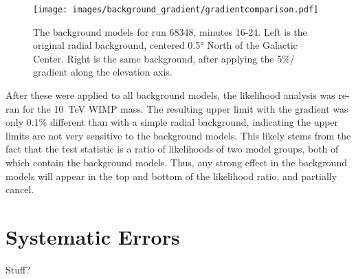  \begin{figure}[ht]
    \centering
    \texttt{[image: images/background\_gradient/gradientcomparison.pdf]}
    \caption[Background Gradient Comparison]{
      The background models for run 68348, minutes 16-24.
      Left is the original radial background, centered \ang{0.5} North of the Galactic Center.
      Right is the same background, after applying the 5\%/\degree{} gradient along the elevation axis.
    }
    \label{fig:bkg_flatvsgrad}
  \end{figure}
  
  After these were applied to all background models, the likelihood analysis was re-ran for the \SI{10}{\TeV} WIMP mass.
  The resulting upper limit with the gradient was only 0.1\% different than with a simple radial background, indicating the upper limits are not very sensitive to the background models.
  This likely stems from the fact that the test statistic is a ratio of likelihoods of two model groups, both of which contain the background models.
  Thus, any strong effect in the background models will appear in the top and bottom of the likelihood ratio, and partially cancel.
  
  
  
  

\section{Systematic Errors}  

Stuff?



